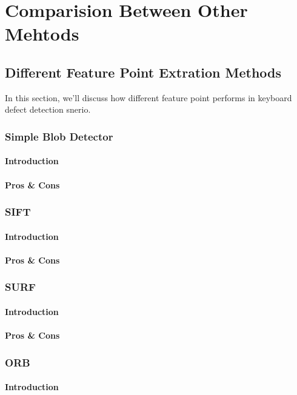 \chapter{Comparision Between Other Mehtods}
\label{c:comparision}

\section{Different Feature Point Extration Methods}
	In this section, we'll discuss how different feature point performs in keyboard defect detection snerio.
	\subsection{Simple Blob Detector}
		\subsubsection{Introduction}
		\subsubsection{Pros \& Cons}
	\subsection{SIFT}
		\subsubsection{Introduction}
		\subsubsection{Pros \& Cons}
	\subsection{SURF}
		\subsubsection{Introduction}
		\subsubsection{Pros \& Cons}
	\subsection{ORB}
		\subsubsection{Introduction}
